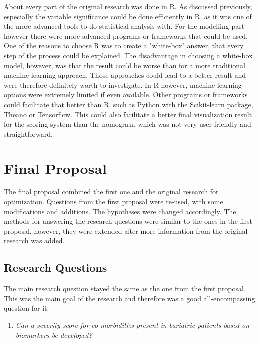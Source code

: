 \documentclass[10pt,a4paper]{article}
\begin{document}
	About every part of the original research was done in R. As discussed previously, especially the variable significance could be done efficiently in R, as it was one of the more advanced tools to do statistical analysis with. For the modelling part however there were more advanced programs or frameworks that could be used. One of the reasons to choose R was to create a "white-box" answer, that every step of the process could be explained. The disadvantage in choosing a white-box model, however, was that the result could be worse than for a more traditional machine learning approach. Those approaches could lead to a better result and were therefore definitely worth to investigate. In R however, machine learning options were extremely limited if even available. Other programs or frameworks could facilitate that better than R, such as Python with the Scikit-learn package, Theano or Tensorflow. This could also facilitate a better final visualization result for the scoring system than the nomogram, which was not very user-friendly and straightforward.
	
	\clearpage
	
	\section{Final Proposal}
	\label{sec:FinalProposal}
	
	The final proposal combined the first one and the original research for optimization. Questions from the first proposal were re-used, with some modifications and additions. The hypotheses were changed accordingly. The methods for answering the research questions were similar to the ones in the first proposal, however, they were extended after more information from the original research was added. 
	
	\subsection{Research Questions}
	
	The main research question stayed the same as the one from the first proposal. This was the main goal of the research and therefore was a good all-encompassing question for it. 
	
	\begin{enumerate}
		\item[] \emph{Can a severity score for co-morbidities present in bariatric patients based on biomarkers be developed?}
	\end{enumerate}
	
\end{document}
